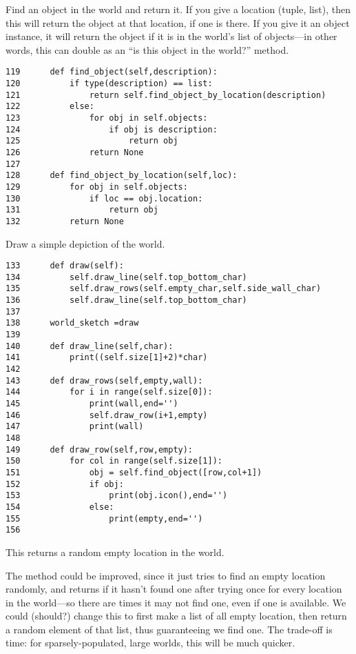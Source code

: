 \documentclass[11pt]{tufte-handout}
\begin{document}
Find an object in the world and return it.  If you give a location (tuple, list), then this will return the object at that location, if one is there.  If you give it an object instance, it will return the object if it is in the world's list of objects---in other words, this can double as an ``is this object in the world?'' method.

\begin{verbatim}
119      def find_object(self,description):
120          if type(description) == list:
121              return self.find_object_by_location(description)
122          else:
123              for obj in self.objects:
124                  if obj is description:
125                      return obj
126              return None
127  
128      def find_object_by_location(self,loc):
129          for obj in self.objects:
130              if loc == obj.location:
131                  return obj
132          return None
\end{verbatim}

Draw a simple depiction of the world.

\begin{verbatim}
133      def draw(self):
134          self.draw_line(self.top_bottom_char)
135          self.draw_rows(self.empty_char,self.side_wall_char)
136          self.draw_line(self.top_bottom_char)
137  
138      world_sketch =draw  
139          
140      def draw_line(self,char):
141          print((self.size[1]+2)*char)
142  
143      def draw_rows(self,empty,wall):
144          for i in range(self.size[0]):
145              print(wall,end='')
146              self.draw_row(i+1,empty)
147              print(wall)
148  
149      def draw_row(self,row,empty):
150          for col in range(self.size[1]):
151              obj = self.find_object([row,col+1])
152              if obj:
153                  print(obj.icon(),end='')
154              else:
155                  print(empty,end='')
156  
\end{verbatim}

This returns a random empty location in the world. 

The method could be improved, since it just tries to find an empty location randomly, and returns if it hasn't found one after trying once for every location in the world---so there are times it may not find one, even if one is available.  We could (should?) change this to first make a list of all empty location, then return a random element of that list, thus guaranteeing we find one.  The trade-off is time:  for sparsely-populated, large worlds, this will be much quicker.
\end{document}
